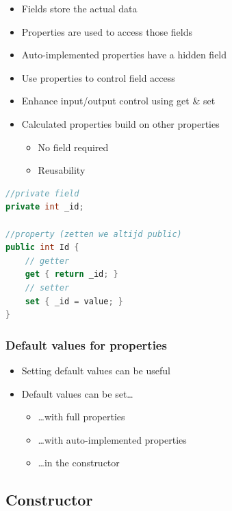 \documentclass{article}
\begin{document}
\begin{itemize}
    \item Fields store the actual data
    \item Properties are used to access those fields
    \item Auto-implemented properties have a hidden field
    \item Use properties to control field access
    \item Enhance input/output control using get \& set
    \item Calculated properties build on other properties
    \begin{itemize}
        \item No field required
        \item Reusability
    \end{itemize}
\end{itemize}

\begin{lstlisting}[language=csharp]
//private field
private int _id;

//property (zetten we altijd public)
public int Id {
    // getter
    get { return _id; }
    // setter
    set { _id = value; }
}
\end{lstlisting}


\subsubsection{Default values for properties}

\begin{itemize}
    \item Setting default values can be useful
    \item Default values can be set\dots
    \begin{itemize}
        \item \dots with full properties
        \item \dots with auto-implemented properties
        \item \dots in the constructor
    \end{itemize}
\end{itemize}

\subsection{Constructor}
\end{document}
